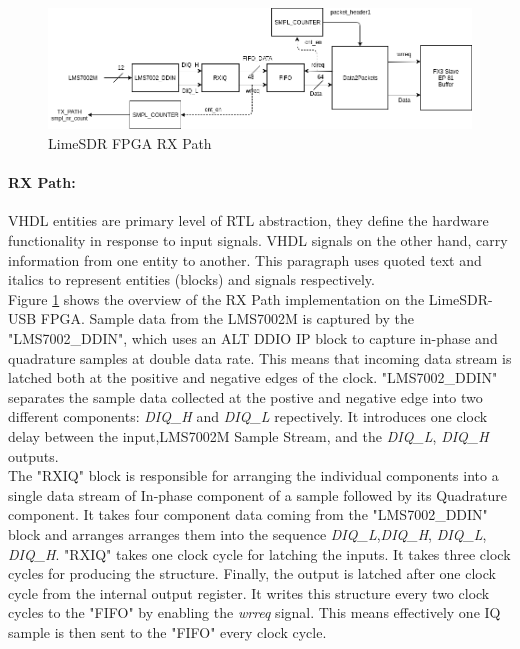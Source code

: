 \begin{figure}[h!]
\centering
\includegraphics[width=\textwidth]{Figure/DATA2PACKETS.png}
\caption{LimeSDR FPGA RX Path}
\label{RX_Path}
\end{figure}

\paragraph{RX Path:}
\ac{VHDL} entities are primary level of \ac{RTL} abstraction, they define the hardware functionality in response to input signals.
\ac{VHDL} signals on the other hand, carry information from one entity to another.
This paragraph uses quoted text and italics to represent entities (blocks) and signals respectively.\\

Figure \ref{RX_Path} shows the overview of the RX Path implementation on the LimeSDR-USB \ac{FPGA}.
Sample data from the LMS7002M is captured by the "LMS7002\_DDIN", which uses an ALT DDIO IP block to capture in-phase and quadrature samples at double data rate.
This means that incoming data stream is latched both at the positive and negative edges of the clock.
"LMS7002\_DDIN" separates the sample data collected at the postive and negative edge into two different components: \textit{DIQ\_H} and \textit{DIQ\_L} repectively.
It introduces one clock delay between the input,LMS7002M Sample Stream, and the \textit{DIQ\_L}, \textit{DIQ\_H} outputs.\\

The "RXIQ" block is responsible for arranging the individual components into a single data stream of In-phase component of a sample followed by its Quadrature component.
It takes four component data coming from the "LMS7002\_DDIN" block and arranges arranges them into the sequence \textit{DIQ\_L},\textit{DIQ\_H}, \textit{DIQ\_L}, \textit{DIQ\_H}.
"RXIQ" takes one clock cycle for latching the inputs.
It takes three clock cycles for producing the structure.
Finally, the output is latched after one clock cycle from the internal output register.
It writes this structure every two clock cycles to the "FIFO" by enabling the \textit{wrreq} signal.
This means effectively one IQ sample is then sent to the "FIFO" every clock cycle. \\

